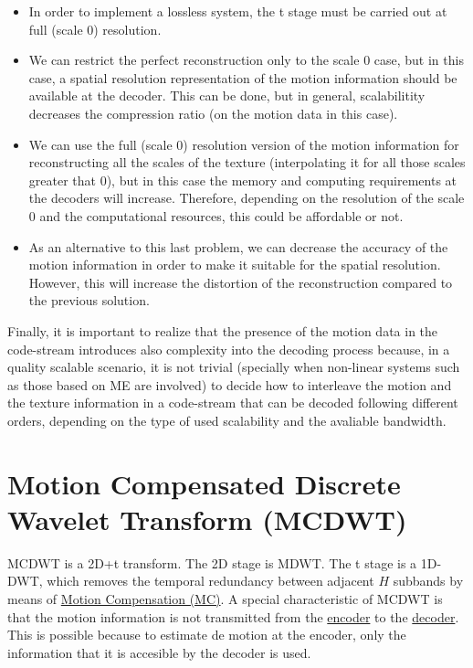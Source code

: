 \begin{itemize}
\item In order to implement a lossless system, the t stage must be
  carried out at full (scale 0) resolution.
\item We can restrict the perfect reconstruction only to the scale 0
  case, but in this case, a spatial resolution representation of the
  motion information should be available at the decoder. This can be
  done, but in general, scalabilitity decreases the compression ratio
  (on the motion data in this case).
\item We can use the full (scale 0) resolution version of the motion
  information for reconstructing all the scales of the texture
  (interpolating it for all those scales greater that 0), but in this
  case the memory and computing requirements at the decoders will
  increase. Therefore, depending on the resolution of the scale 0 and the
  computational resources, this could be affordable or not.
\item As an alternative to this last problem, we can decrease the
  accuracy of the motion information in order to make it suitable for
  the spatial resolution. However, this will increase the distortion
  of the reconstruction compared to the previous solution.
\end{itemize}

Finally, it is important to realize that the presence of the motion
data in the code-stream introduces also complexity into the decoding
process because, in a quality scalable scenario, it is not trivial
(specially when non-linear systems such as those based on ME are
involved) to decide how to interleave the motion and the texture
information in a code-stream that can be decoded following different
orders, depending on the type of used scalability and the avaliable
bandwidth.


\section{Motion Compensated Discrete Wavelet Transform (MCDWT)}

MCDWT is a 2D+t transform. The 2D stage is MDWT. The t stage is a
1D-DWT, which removes the temporal redundancy between adjacent $H$
subbands by means of
\href{https://en.wikipedia.org/wiki/Motion_compensation}{Motion
  Compensation (MC)}. A special characteristic of MCDWT is that the
motion information is not transmitted from the
\href{https://en.wikipedia.org/wiki/Encoder}{encoder} to the
\href{https://en.wikipedia.org/wiki/Decoder}{decoder}. This is
possible because to estimate de motion at the encoder, only the
information that it is accesible by the decoder is used.

